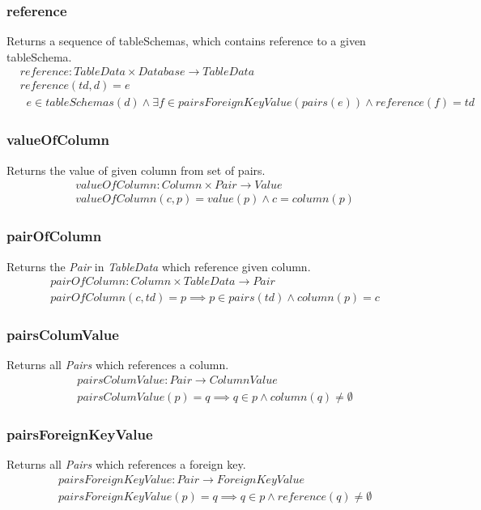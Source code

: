 \documentclass[10pt]{article}
\begin{document}
\subsubsection{reference}
Returns a sequence of tableSchemas, which contains reference to a given tableSchema.
\begin{align}
& reference: TableData \times Database \rightarrow TableData \\
& reference(td, d) = e \\
& \;\; e \in tableSchemas(d) \land \exists f \in pairsForeignKeyValue(pairs(e)) \land reference(f) = td  
\end{align}


\subsubsection{valueOfColumn}
Returns the value of given column from set of pairs.
\begin{align}
& valueOfColumn: Column \times Pair \rightarrow Value \\
& valueOfColumn(c, p) = value(p) \land c = column(p)
\end{align}

\subsubsection{pairOfColumn}
Returns the \emph{Pair} in \emph{TableData} which reference given column.
\begin{align}
& pairOfColumn: Column \times TableData \rightarrow Pair \\
& pairOfColumn(c, td) = p \implies p \in pairs(td) \land column(p) = c
\end{align}


\subsubsection{pairsColumValue}
Returns all \emph{Pairs} which references a column.
\begin{align}
& pairsColumValue: Pair \rightarrow ColumnValue \\
& pairsColumValue(p) = q \implies q \in p \land column(q) \neq \emptyset  
\end{align}

\subsubsection{pairsForeignKeyValue}
Returns all \emph{Pairs} which references a foreign key.
\begin{align}
& pairsForeignKeyValue : Pair \rightarrow ForeignKeyValue \\
& pairsForeignKeyValue(p) = q \implies q \in p \land reference(q) \neq \emptyset 
\end{align}
\end{document}
